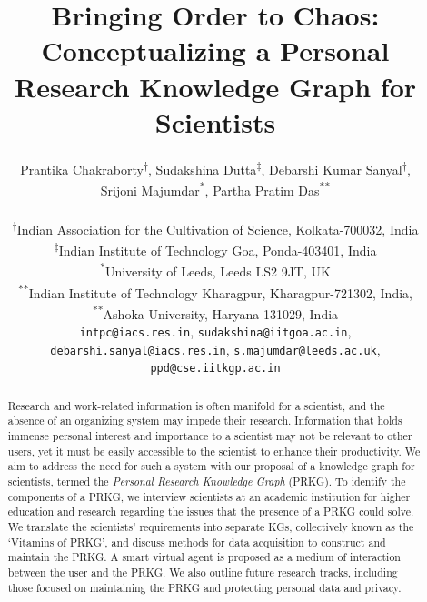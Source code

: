 \documentclass[11pt,pdftex]{article}
\begin{document}
\title{Bringing Order to Chaos: Conceptualizing a Personal Research Knowledge Graph for Scientists}
\author{Prantika Chakraborty\textsuperscript{$\dagger$}, Sudakshina Dutta\textsuperscript{$\ddagger$}, Debarshi Kumar Sanyal\textsuperscript{$\dagger$}, 
\\
Srijoni Majumdar\textsuperscript{*}, Partha Pratim Das\textsuperscript{**}
\\\\
\textsuperscript{$\dagger$}Indian Association for the Cultivation of Science, Kolkata-700032, India
\\
\textsuperscript{$\ddagger$}Indian Institute of Technology Goa, Ponda-403401, India\\
\textsuperscript{*}University of Leeds, Leeds
LS2 9JT, UK\\
\textsuperscript{**}Indian Institute of Technology Kharagpur, Kharagpur-721302, India,\\ 
\textsuperscript{**}Ashoka University, Haryana-131029, India\\
\texttt{intpc@iacs.res.in}, \texttt{sudakshina@iitgoa.ac.in},\\
\texttt{debarshi.sanyal@iacs.res.in}, 
\texttt{s.majumdar@leeds.ac.uk}, \\
\texttt{ppd@cse.iitkgp.ac.in}
}


\maketitle

\begin{abstract}
Research and work-related information is often manifold for a scientist, and the absence of an organizing system may impede their research.  Information that holds immense personal interest and importance to a scientist may not be relevant to other users, yet it must be easily accessible to the scientist to enhance their productivity. We aim to address the need for such a system with our proposal of a knowledge graph for scientists, termed the \textit{Personal Research Knowledge Graph} (PRKG). To identify the components of a PRKG, we interview scientists at an academic institution for higher education and research regarding the issues that the presence of a PRKG could solve. We translate the scientists' requirements into separate KGs, collectively known as the `Vitamins of PRKG', and discuss  methods for data acquisition to construct and maintain the PRKG. A smart virtual agent is proposed as a medium of interaction between the user and the PRKG. We also outline future research tracks, including those focused on maintaining the PRKG and protecting personal data and privacy.
\end{abstract}
\end{document}
